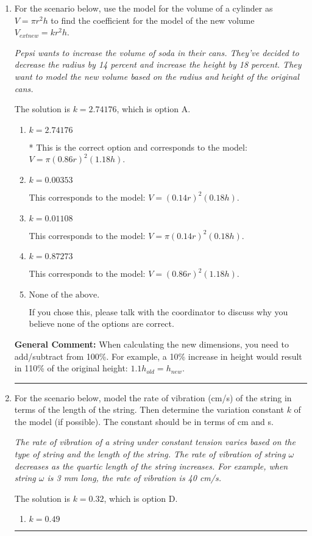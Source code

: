 \documentclass{extbook}[14pt]
\newcommand{\litem}[1]{\item #1

\rule{\textwidth}{0.4pt}}
\begin{document}
\begin{enumerate}\litem{
For the scenario below, use the model for the volume of a cylinder as $V = \pi r^2 h$ to find the coefficient for the model of the new volume $V_{	ext{new}} = k r^2 h$.

\begin{center}
    \textit{ Pepsi wants to increase the volume of soda in their cans. They've decided to decrease the radius by 14 percent and increase the height by 18 percent. They want to model the new volume based on the radius and height of the original cans. }
\end{center}
The solution is \( k = 2.74176 \), which is option A.\begin{enumerate}[label=\Alph*.]
\item \( k = 2.74176 \)

* This is the correct option and corresponds to the model: $V = \pi (0.86 r)^2 (1.18 h)$.
\item \( k = 0.00353 \)

This corresponds to the model: $V = (0.14 r)^2 (0.18 h)$.
\item \( k = 0.01108 \)

This corresponds to the model: $V = \pi (0.14 r)^2 (0.18 h)$.
\item \( k = 0.87273 \)

This corresponds to the model: $V = (0.86 r)^2 (1.18 h)$.
\item \( \text{None of the above.} \)

If you chose this, please talk with the coordinator to discuss why you believe none of the options are correct.
\end{enumerate}

\textbf{General Comment:} When calculating the new dimensions, you need to add/subtract from 100\%. For example, a 10\% increase in height would result in 110\% of the original height: $1.1h_{old} = h_{new}$.
}
\litem{
For the scenario below, model the rate of vibration (cm/s) of the string in terms of the length of the string. Then determine the variation constant $k$ of the model (if possible). The constant should be in terms of cm and s.

\begin{center}
    \textit{ The rate of vibration of a string under constant tension varies based on the type of string and the length of the string. The rate of vibration of string $\omega$ decreases as the quartic length of the string increases. For example, when string $\omega$ is 3 mm long, the rate of vibration is 40 cm/s. }
\end{center}
The solution is \( k = 0.32 \), which is option D.\begin{enumerate}[label=\Alph*.]
\item \( k = 0.49 \)


\end{enumerate}}
\end{enumerate}
\end{document}

